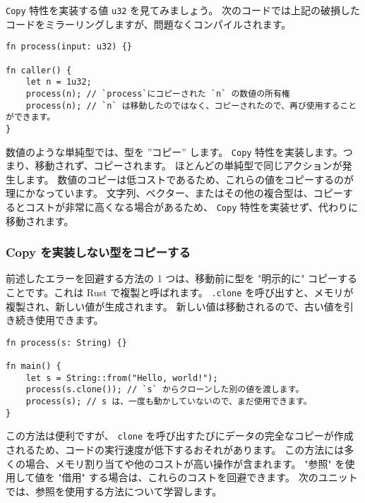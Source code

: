 \texttt{Copy} 特性を実装する値 \texttt{u32} を見てみましょう。 次のコードでは上記の破損したコードをミラーリングしますが、問題なくコンパイルされます。


\begin{lstlisting}[numbers=none]
fn process(input: u32) {}

fn caller() {
    let n = 1u32;
    process(n); // `process`にコピーされた `n` の数値の所有権
    process(n); // `n` は移動したのではなく、コピーされたので、再び使用することができます。
}
\end{lstlisting}

数値のような単純型では、型を ''コピー'' します。 \texttt{Copy} 特性を実装します。つまり、移動されず、コピーされます。 ほとんどの単純型で同じアクションが発生します。 数値のコピーは低コストであるため、これらの値をコピーするのが理にかなっています。 文字列、ベクター、またはその他の複合型は、コピーするとコストが非常に高くなる場合があるため、 \texttt{Copy} 特性を実装せず、代わりに移動されます。

\subsubsection{Copy を実装しない型をコピーする}

前述したエラーを回避する方法の 1 つは、移動前に型を "明示的に" コピーすることです。これは Rust で複製と呼ばれます。 \texttt{.clone} を呼び出すと、メモリが複製され、新しい値が生成されます。 新しい値は移動されるので、古い値を引き続き使用できます。

\begin{lstlisting}[numbers=none]
fn process(s: String) {}

fn main() {
    let s = String::from("Hello, world!");
    process(s.clone()); // `s` からクローンした別の値を渡します。
    process(s); // s は、一度も動かしていないので、まだ使用できます。
}
\end{lstlisting}


この方法は便利ですが、 \texttt{clone} を呼び出すたびにデータの完全なコピーが作成されるため、コードの実行速度が低下するおそれがあります。 この方法には多くの場合、メモリ割り当てや他のコストが高い操作が含まれます。 "参照" を使用して値を "借用" する場合は、これらのコストを回避できます。 次のユニットでは、参照を使用する方法について学習します。
